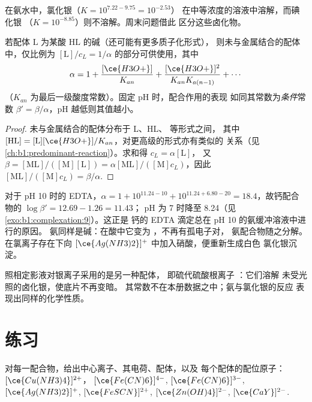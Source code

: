 在氨水中，氯化银（$K = 10^{7.22 - 9.75} = 10^{-2.53}$）
在中等浓度的溶液中溶解，而碘化银
（$K = 10^{-8.85}$）则不溶解。周末问题借此
区分这些卤化物。

\begin{proposition}[配合作用与酸度的对抗]\label{prop:b1:complexation:ligand-acidity}
若配体 $\mathrm{L}$ 为某酸 $\mathrm{HL}$ 的碱（还可能有更多质子化形式），
则未与金属结合的配体中，仅比例为 $[\mathrm{L}]/c_L =
1/\alpha$ 的部分可供使用，其中
\[
  \alpha = 1 + \frac{[\ce{H3O+}]}{K_{an}} + \frac{[\ce{H3O+}]^2}{K_{an}K_{a(n-1)}}
  + \cdots
\]
（$K_{an}$ 为最后一级酸度常数）。固定 pH 时，配合作用的表现
如同其常数为\emph{条件}常数
$\beta' = \beta/\alpha$，pH 越低则其值越小。
\end{proposition}

\begin{proof}
未与金属结合的配体分布于 L、HL、 等形式之间，
其中 $[\mathrm{HL}] = [\mathrm{L}][\ce{H3O+}]/K_{an}$，对更高级的形式亦有类似的
关系（见\cref{ch:b1:predominant-reaction}）。求和得 $c_L = \alpha[\mathrm{L}]$，
又 $\beta = [\mathrm{ML}]/([\mathrm{M}][\mathrm{L}]) =
\alpha[\mathrm{ML}]/([\mathrm{M}]c_L)$，因此 $[\mathrm{ML}]/([\mathrm{M}]c_L)
= \beta/\alpha$.
\end{proof}

对于 pH 10 时的 EDTA，$\alpha = 1 + 10^{11.24 - 10} + 10^{11.24 + 6.80 - 20}
= 18.4$，故钙配合物的 $\log\beta' = 12.69 - 1.26 = 11.43$；
pH 为 7 时降至 8.24（见\cref{exo:b1:complexation:9}）。这正是
钙的 EDTA 滴定总在 pH 10 的氨缓冲溶液中进行的原因。
氨同样是碱：在酸中它变为 ，不再有孤电子对，
氨配合物随之分解。在氯离子存在下向
$[\ce{Ag(NH3)2}]^{+}$ 中加入硝酸，便重新生成白色
氯化银沉淀。

照相定影液对银离子采用的是另一种配体，
即硫代硫酸根离子 ：它们溶解
未受光照的卤化银，使底片不再变暗。
其常数不在本册数据之中；氨与氯化银的反应
表现出同样的化学性质。

\section{练习}

\begin{exercise}[$\star$]\label{exo:b1:complexation:1}
对每一配合物，给出中心离子、其电荷、配体，以及
每个配体的配位原子：$[\ce{Cu(NH3)4}]^{2+}$，
$[\ce{Fe(CN)6}]^{4-}$, $[\ce{Fe(CN)6}]^{3-}$, $[\ce{Ag(NH3)2}]^{+}$,
$[\ce{FeSCN}]^{2+}$, $[\ce{Zn(OH)4}]^{2-}$, $[\ce{CaY}]^{2-}$.
\end{exercise}

